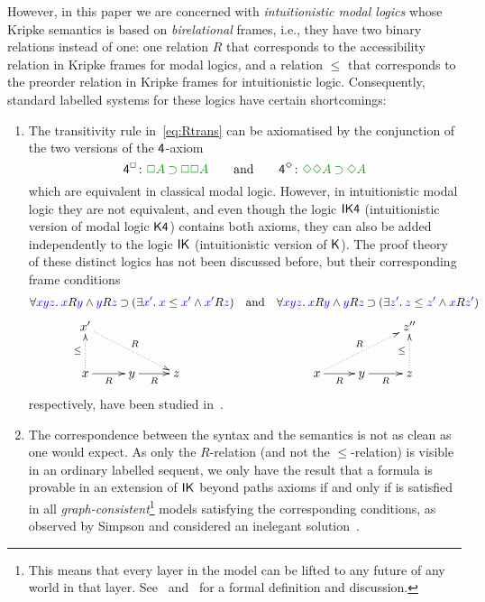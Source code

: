 \documentclass[a4paper]{article}
\begin{document}
 However,
 in this paper we are concerned with \emph{intuitionistic modal
 	logics} whose Kripke semantics is based on \emph{birelational}
 frames, i.e., they have two binary relations instead of one: one
 relation $R$ that corresponds to the accessibility relation in 
 Kripke frames for modal logics, and a relation $\le$ that
 corresponds to the preorder relation in Kripke frames for
 intuitionistic logic. Consequently, standard labelled systems for
 these logics have certain shortcomings:
 \begin{enumerate}
 	\item The transitivity rule in~\eqref{eq:Rtrans} can be axiomatised by the conjunction of the two
 	versions of the $\mathsf{4}$-axiom
 	\begin{equation}
 	\label{eq:4ax}
 	\ax{4^{\BOX}}\colon\fm{\BOX A\IMP \BOX\BOX A}
 	\qquand
 	\rn{4^{\DIA}}\colon\fm{\DIA\DIA A\IMP\DIA A}
 	\end{equation}
 	which are equivalent in classical
 	modal logic. However, in intuitionistic modal logic they are not
 	equivalent, and even though the logic $\mathsf{IK4}$ 
 	(intuitionistic version of modal logic $\mathsf{K4}$) contains both
 	axioms, they can also be added independently to the logic $\mathsf{IK}$ 
 	(intuitionistic version of $\mathsf{K}$). The proof theory of these
 	distinct logics has not been discussed before, but their
 	corresponding frame conditions
 	\begin{equation}
 	\label{eq:4frame}
 	\forall{\color{blue}{xyz}}.\:{\color{blue}{x}}R{\color{blue}{y}}\mathbin{\wedge} {\color{blue}{y}}R{\color{blue}{z}}\mathbin{\supset}(\exists{\color{blue}{x'}}.\:{\color{blue}{x}}\le{{\color{blue}{x'}}}\mathbin{\wedge}{\color{blue}{x'}}R{\color{blue}{z}})
 	\quad\mbox{and}\quad
 	\forall{\color{blue}{xyz}}.\:{\color{blue}{x}}R{\color{blue}{y}}\mathbin{\wedge} {\color{blue}{y}}R{\color{blue}{z}}\mathbin{\supset}(\exists{\color{blue}{z'}}.\:{\color{blue}{z}}\le{{\color{blue}{z'}}}\mathbin{\wedge}{\color{blue}{x}}R{\color{blue}{z'}})
 	\;
 	\end{equation}
 	$$
 	\xymatrix{
 		x' \ar@{.>}[drr]^R \\
 		x \ar@{.>}[u]^\le \ar@{->}[r]_{R} & y \ar@{->}[r]_{R} & z
 	}
 	\hskip10em
 	\xymatrix{
 		&& z''  \\
 		x  \ar@{.>}[urr]^R \ar@{->}[r]_{R} & y \ar@{->}[r]_{R} & z \ar@{.>}[u]^\le
 	}
 	$$
 	respectively, have been studied in~\cite{plotkin:stirling:86}.
 	\item The correspondence between the syntax and the semantics is not
 	as clean as one would expect. As only the $R$-relation (and not the
 	$\le$-relation) is visible in an ordinary labelled
 	sequent, we only have the result that a formula is provable in an extension of $\mathsf{IK}$ beyond paths axioms 
 	if and only if is satisfied in all \emph{graph-consistent}\footnote{This
 		means that every layer in the model can be lifted to any future of
 		any world in that layer. See~\cite{simpson:phd} and~\cite{mar:str:tableaux17} for a formal definition and discussion.}   
 	models satisfying the corresponding conditions, as observed by Simpson	and considered an inelegant solution~\cite{simpson:phd}.
 \end{enumerate}
\end{document}
